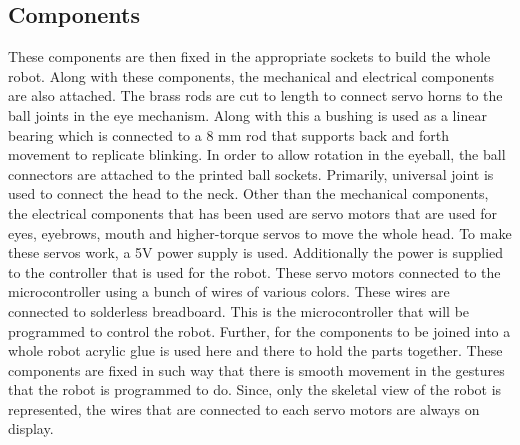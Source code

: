 \documentclass[letterpaper,12pt]{article}
\begin{document}
\begin{multicols}{2}
\section{Components}
These components are then fixed in the appropriate sockets to build the whole robot. Along with these components, the mechanical and electrical components are also attached. The brass rods are cut to length to connect servo horns to the ball joints in the eye mechanism. Along with this a bushing is used as a linear bearing which is connected to a 8 mm rod that supports back and forth movement to replicate blinking. In order to allow rotation in the eyeball, the ball connectors are attached to the printed ball sockets. Primarily, universal joint is used to connect the head to the neck. Other than the mechanical components, the electrical components that has been used are servo motors that are used for eyes, eyebrows, mouth and higher-torque servos to move the whole head. To make these servos work, a 5V power supply is used. Additionally the power is supplied to the controller that is used for the robot. These servo motors connected to the microcontroller using a bunch of wires of various colors. These wires are connected to solderless breadboard. This is the microcontroller that will be programmed to control the robot. Further, for the components to be joined into a whole robot acrylic glue is used here and there to hold the parts together. These components are fixed in such way that there is smooth movement in the gestures that the robot is programmed to do. Since, only the skeletal view of the robot is represented, the wires that are connected to each servo motors are always on display.


\end{multicols}
\end{document}
